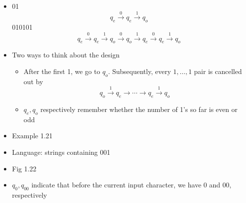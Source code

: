 \begin{frame}[allowframebreaks]
\begin{itemize}
\item [] 01
  \begin{equation*}
    q_e \xrightarrow{0} q_e \xrightarrow{1} q_o
  \end{equation*}
  010101
  \begin{equation*}
    q_e \xrightarrow{0} q_e \xrightarrow{1} q_o
    \xrightarrow{0} q_o \xrightarrow{1} q_e \xrightarrow{0} q_e
    \xrightarrow{1} q_o
  \end{equation*}
  
\item Two ways to think about the design
  \begin{itemize}
  \item After the first 1, we go to $q_o$. Subsequently, every $1, \ldots, 1$ pair is cancelled out by
  \begin{equation*}
q_o \xrightarrow{1} q_e \rightarrow \cdots \rightarrow q_e
    \xrightarrow{1} q_o
  \end{equation*}
\item $q_e, q_o$ respectively remember whether the number of 1's
  so far is even or odd
  \end{itemize}
\item Example 1.21
  
\item [] Language: strings containing 001

\item [] Fig 1.22

\begin{center}
    \end{center}
  \item $q_0, q_{00}$ indicate that before the current input character,
    we have 0 and 00, respectively
  \end{itemize}\end{frame}



